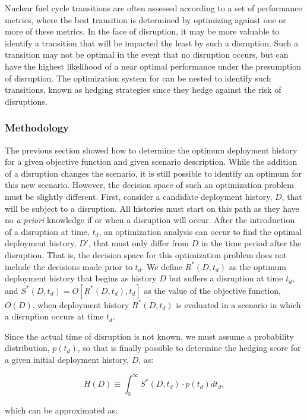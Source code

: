 Nuclear fuel cycle transitions are often assessed according to a set of
performance metrics, where the best transition is determined by optimizing
against one or more of these metrics.  In the face of disruption, it may be
more valuable to identify a transition that will be impacted the least by such
a disruption.  Such a transition may not be optimal in the event that no
disruption occurs, but can have the highest likelihood of a near optimal
performance under the presumption of disruption.  The optimization system for
\Cyclus{} can be nested to identify such transitions, known as hedging
strategies since they hedge against the risk of disruptions.

\subsubsection{Methodology}

The previous section showed how to determine the optimum deployment history
for a given objective function and given scenario description.  While the
addition of a disruption changes the scenario, it is still possible to
identify an optimum for this new scenario.  However, the decision space of
such an optimization problem must be slightly different.  First, consider a
candidate deployment history, $D$, that will be subject to a disruption. All
histories must start on this path as they have no \textit{a priori} knowledge
if or when a disruption will occur.  After the introduction of a disruption at
time, $t_d$, an optimization analysis can occur to find the optimal deployment
history, $D'$, that must only differ from $D$ in the time period after the
disruption.  That is, the decision space for this optimization problem does
not include the decisions made prior to $t_d$.  We define $R^*(D,t_d)$ as the
optimum deployment history that begins as history $D$ but suffers a disruption
at time $t_d$, and $S^*(D,t_d) = O[R^*(D,t_d),t_d]$ as the value of the
objective function, $O(D)$, when deployment history $R^*(D,t_d)$ is evaluated
in a scenario in which a disruption occurs at time $t_d$.

Since the actual time of disruption is not known, we must assume a probability
distribution, $p(t_d)$, so that is finally possible to determine the hedging
score for a given initial deployment history, $D$, as:

$$H(D) \equiv \int_0^\infty S^*(D,t_d) \cdot p(t_d) dt_d,$$

\noindent which can be approximated as:

